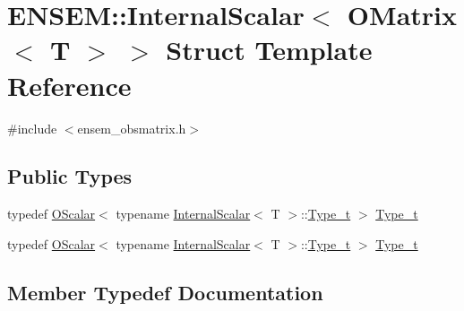 \hypertarget{structENSEM_1_1InternalScalar_3_01OMatrix_3_01T_01_4_01_4}{}\section{E\+N\+S\+EM\+:\+:Internal\+Scalar$<$ O\+Matrix$<$ T $>$ $>$ Struct Template Reference}
\label{structENSEM_1_1InternalScalar_3_01OMatrix_3_01T_01_4_01_4}


{\ttfamily \#include $<$ensem\+\_\+obsmatrix.\+h$>$}

\subsection*{Public Types}
\begin{DoxyCompactItemize}
\item 
typedef \mbox{\hyperlink{classENSEM_1_1OScalar}{O\+Scalar}}$<$ typename \mbox{\hyperlink{structENSEM_1_1InternalScalar}{Internal\+Scalar}}$<$ T $>$\+::\mbox{\hyperlink{structENSEM_1_1InternalScalar_3_01OMatrix_3_01T_01_4_01_4_a1e1ab78c916da9274cc273535dd0a08a}{Type\+\_\+t}} $>$ \mbox{\hyperlink{structENSEM_1_1InternalScalar_3_01OMatrix_3_01T_01_4_01_4_a1e1ab78c916da9274cc273535dd0a08a}{Type\+\_\+t}}
\item 
typedef \mbox{\hyperlink{classENSEM_1_1OScalar}{O\+Scalar}}$<$ typename \mbox{\hyperlink{structENSEM_1_1InternalScalar}{Internal\+Scalar}}$<$ T $>$\+::\mbox{\hyperlink{structENSEM_1_1InternalScalar_3_01OMatrix_3_01T_01_4_01_4_a1e1ab78c916da9274cc273535dd0a08a}{Type\+\_\+t}} $>$ \mbox{\hyperlink{structENSEM_1_1InternalScalar_3_01OMatrix_3_01T_01_4_01_4_a1e1ab78c916da9274cc273535dd0a08a}{Type\+\_\+t}}
\end{DoxyCompactItemize}


\subsection{Member Typedef Documentation}
\mbox{\label{structENSEM_1_1InternalScalar_3_01OMatrix_3_01T_01_4_01_4_a1e1ab78c916da9274cc273535dd0a08a}} 
